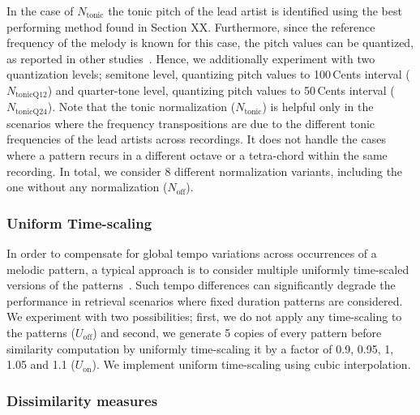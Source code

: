 In the case of $N_{\mathrm{tonic}}$ the tonic pitch of the lead artist is identified using the best performing method found in Section XX. Furthermore, since the reference frequency of the melody is known for this case, the pitch values can be quantized, as reported in other studies~\cite{Ross2012b}. Hence, we additionally experiment with two quantization levels; semitone level, quantizing pitch values to 100\,Cents interval ($N_{\mathrm{tonicQ12}}$) and quarter-tone level,  quantizing pitch values to 50\,Cents interval ($N_{\mathrm{tonicQ24}}$). Note that the tonic normalization ($N_{\mathrm{tonic}}$) is helpful only in the scenarios where the frequency transpositions are due to the different tonic frequencies of the lead artists across recordings. It does not handle the cases where a pattern recurs in a different octave or a tetra-chord within the same recording. In total, we consider 8 different normalization variants, including the one without any normalization ($N_{\mathrm{off}}$). 

\subsubsection{Uniform Time-scaling}
\label{sec:patterns_melodic_similarity_time_scaling}

In order to compensate for global tempo variations across occurrences of a melodic pattern, a typical approach is to consider multiple uniformly time-scaled versions of the patterns~\citep{mazzoni2001melody, kotsifakos2012survey}. Such tempo differences can significantly degrade the performance in retrieval scenarios where fixed duration patterns are considered. We experiment with two possibilities; first,  we do not apply any time-scaling to the patterns ($U_{\mathrm{off}}$) and second, we generate 5 copies of every pattern before similarity computation by uniformly time-scaling it by a factor of 0.9, 0.95, 1, 1.05 and 1.1 ($U_{\mathrm{on}}$). We implement uniform time-scaling using cubic interpolation. 

\subsubsection{Dissimilarity measures}
\label{sec:patterns_melodic_similarity_dissimilarity measures}

